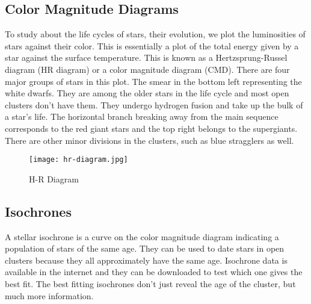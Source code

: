 \subsection{Color Magnitude Diagrams}
To study about the life cycles of stars, their evolution, we plot the luminosities of stars against their color. This is essentially a plot of the total energy given by a star against the surface temperature. This is known as a Hertzsprung-Russel diagram (HR diagram) or a color magnitude diagram (CMD). There are four major groups of stars in this plot. The smear in the bottom left representing the white dwarfs. They are among the older stars in the life cycle and most open clusters don't have them. They undergo hydrogen fusion and take up the bulk of a star's life. The horizontal branch breaking away from the main sequence corresponds to the red giant stars and the top right belongs to the supergiants. There are other minor divisions in the clusters, such as blue stragglers as well.  \citep{introstars}

\begin{figure}[H]
	\centering
	\texttt{[image: hr-diagram.jpg]}
	\caption{H-R Diagram \citep{wimecommons}}
	\label{fig:image3}
\end{figure}

\subsection{Isochrones}
A stellar isochrone is a curve on the color magnitude diagram indicating a population of stars of the same age. They can be used to date stars in open clusters because they all approximately have the same age. Isochrone data is available in the internet and they can be downloaded to test which one gives the best fit. The best fitting isochrones don't just reveal the age of the cluster, but much more information.



